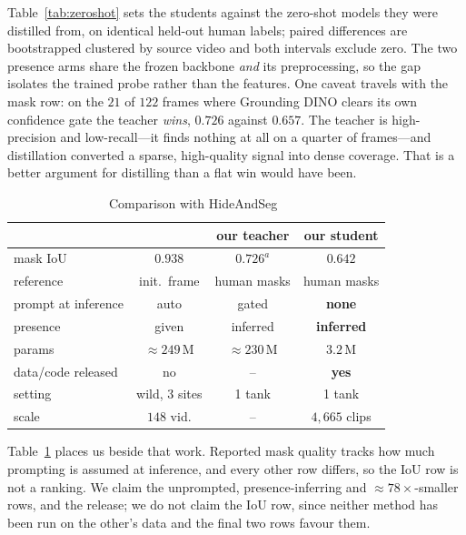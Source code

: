 \documentclass[conference]{IEEEtran}
\begin{document}
Table~\ref{tab:zeroshot} sets the students against the zero-shot models they were
distilled from, on identical held-out human labels; paired differences are
bootstrapped clustered by source video and both intervals exclude zero. The two
presence arms share the frozen backbone \emph{and} its preprocessing, so the gap
isolates the trained probe rather than the features. One caveat travels with the mask row: on the
$21$ of $122$ frames where Grounding DINO clears its own confidence gate the
teacher \emph{wins}, $0.726$ against $0.657$. The teacher is high-precision and
low-recall---it finds nothing at all on a quarter of frames---and distillation
converted a sparse, high-quality signal into dense coverage. That is a better
argument for distilling than a flat win would have been.

\begin{table}[t]\centering
\caption{Comparison with HideAndSeg~\cite{hideandseg}}
\label{tab:sidebyside}
\small
\begin{tabular}{@{}lccc@{}}
\toprule
 & \cite{hideandseg} & our teacher & \textbf{our student} \\
\midrule
mask IoU              & $0.938$             & $0.726^{a}$ & $\mathbf{0.642}$ \\
reference             & init.\ frame        & human masks & human masks \\
prompt at inference   & auto               & gated       & \textbf{none} \\
presence              & given               & inferred    & \textbf{inferred} \\
params                & ${\approx}249$\,M   & ${\approx}230$\,M & $\mathbf{3.2}$\,M \\
data/code released    & no                  & --          & \textbf{yes} \\
setting               & wild, 3 sites       & 1 tank      & 1 tank \\
scale                 & $148$ vid.          & --          & $4{,}665$ clips \\
\bottomrule
\end{tabular}
\end{table}

Table~\ref{tab:sidebyside} places us beside that work. Reported mask quality
tracks how much prompting is assumed at inference, and every other row differs, so
the IoU row is not a ranking. We claim the unprompted, presence-inferring and
${\approx}78\times$-smaller rows, and the release; we do not claim the IoU row,
since neither method has been run on the other's data and the final two rows
favour them.
\end{document}
